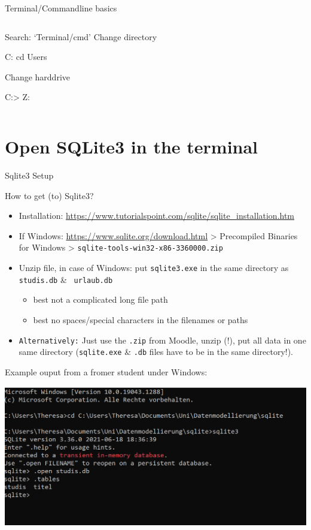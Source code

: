 \begin{frame}{Terminal/Commandline basics}
\begin{columns}
\begin{block}{Search: `Terminal/cmd'}
Change directory
\begin{shell-sessioncode}
C:\> cd Users\sarah
\end{shell-sessioncode}

Change harddrive
\begin{shell-sessioncode}
C:\Users\sarah> Z:
\end{shell-sessioncode}
\end{block}
\end{columns}
\end{frame}

\section{Open SQLite3 in the terminal}
\begin{frame}{Sqlite3 Setup}
\footnotesize
{}

\begin{block}{How to get (to) Sqlite3?}
\begin{itemize}
    \item Installation: \protect\url{https://www.tutorialspoint.com/sqlite/sqlite_installation.htm}
    \item If Windows: \protect\url{https://www.sqlite.org/download.html} > Precompiled Binaries for Windows > \texttt{sqlite-tools-win32-x86-3360000.zip}
    \item Unzip file, in case of Windows: put \texttt{sqlite3.exe} in the same directory as \texttt{studis.db} \& \texttt{ urlaub.db } 
    \begin{itemize}
        \item best not a complicated long file path 
        \item best no spaces/special characters in the filenames or paths
    \end{itemize}
    \item \texttt{Alternatively:} Just use the \texttt{.zip} from Moodle, unzip (!), put all data in one same directory (\texttt{sqlite.exe} \& \texttt{.db} files have to be in the same directory!). 
\end{itemize}
\end{block}

\framebreak

Example ouput from a fromer student under Windows: 

\includegraphics[width=\textwidth]{img/how_to_open_file_in_windows_sqlite3.png}


\end{frame}
